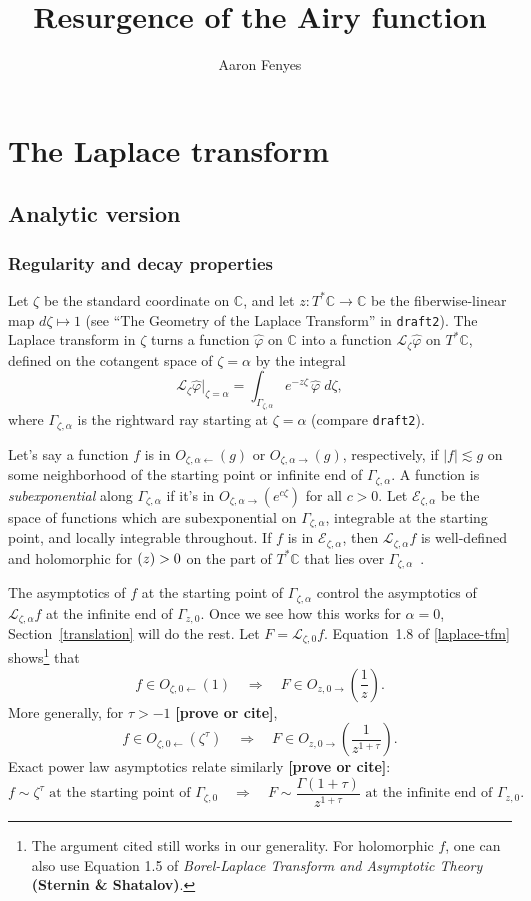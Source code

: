 \documentclass{article}
\title{Resurgence of the Airy function}
\author{Aaron Fenyes}
\theoremstyle{plain}
\newcommand{\maps}{\colon}
\newcommand{\C}{\mathbb{C}}
\let\Re\relax
\DeclareMathOperator{\Re}{Re}
\newcommand{\laplace}{\mathcal{L}}
\begin{document}
\maketitle
\section{The Laplace transform}
\subsection{Analytic version}
\subsubsection{Regularity and decay properties}\label{reg-decay}
Let $\zeta$ be the standard coordinate on $\C$, and let $z \maps T^*\C \to \C$ be the fiberwise-linear map $d\zeta \mapsto 1$ (see ``The Geometry of the Laplace Transform'' in {\tt draft2}). The Laplace transform in $\zeta$ turns a function $\hat{\varphi}$ on $\C$ into a function $\laplace_\zeta \hat{\varphi}$ on $T^*\C$, defined on the cotangent space of $\zeta = \alpha$ by the integral
\[ \laplace_\zeta \hat{\varphi} \big|_{\zeta = \alpha} = \int_{\Gamma_{\zeta, \alpha}} e^{-z \zeta}\,\hat{\varphi}\;d\zeta, \]
where $\Gamma_{\zeta, \alpha}$ is the rightward ray starting at $\zeta = \alpha$ (compare {\tt draft2}).

Let's say a function $f$ is in $O_{\zeta, \alpha \leftarrow}(g)$ or $O_{\zeta, \alpha \rightarrow}(g)$, respectively, if $|f| \lesssim g$ on some neighborhood of the starting point or infinite end of $\Gamma_{\zeta, \alpha}$. A function is {\em subexponential} along $\Gamma_{\zeta, \alpha}$ if it's in $O_{\zeta, \alpha \rightarrow}(e^{c\zeta})$ for all $c > 0$. Let $\mathcal{E}_{\zeta, \alpha}$ be the space of functions which are subexponential on $\Gamma_{\zeta, \alpha}$, integrable at the starting point, and locally integrable throughout. If $f$ is in $\mathcal{E}_{\zeta, \alpha}$, then $\laplace_{\zeta, \alpha} f$ is well-defined and holomorphic for $\Re(z) > 0$ on the part of $T^*\C$ that lies over $\Gamma_{\zeta, \alpha}$~\cite[\S 5.6]{diverg-resurg-i}.

The asymptotics of $f$ at the starting point of $\Gamma_{\zeta, \alpha}$ control the asymptotics of $\laplace_{\zeta, \alpha} f$ at the infinite end of $\Gamma_{z, 0}$. Once we see how this works for $\alpha = 0$, Section~\ref{translation} will do the rest. Let $F = \laplace_{\zeta, 0} f$. Equation~1.8 of \ref{laplace-tfm} shows\footnote{The argument cited still works in our generality. For holomorphic $f$, one can also use Equation 1.5 of {\em Borel-Laplace Transform and Asymptotic Theory} \textbf{(Sternin \& Shatalov)}.} that
\[ f \in O_{\zeta, 0 \leftarrow}(1) \quad\Longrightarrow\quad F \in O_{z, 0 \rightarrow}\left(\frac{1}{z}\right). \]
More generally, for $\tau > -1$ \textbf{[prove or cite]},
\[ f \in O_{\zeta, 0 \leftarrow}(\zeta^\tau) \quad\Longrightarrow\quad F \in O_{z, 0 \rightarrow}\left(\frac{1}{z^{1 + \tau}}\right). \]
Exact power law asymptotics relate similarly \textbf{[prove or cite]}:
\[ f \sim \zeta^\tau \text{ at the starting point of } \Gamma_{\zeta, 0} \quad\Longrightarrow\quad F \sim \frac{\Gamma(1+\tau)}{z^{1+\tau}} \text{ at the infinite end of } \Gamma_{z, 0}. \]
\end{document}
